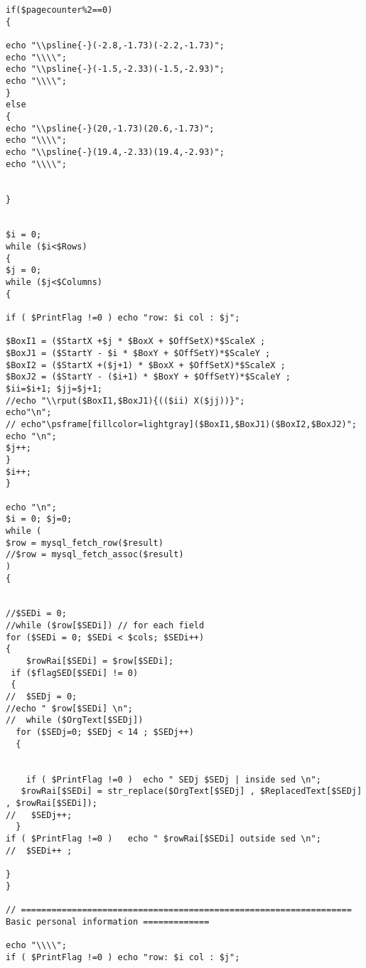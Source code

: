 \begin{verbatim}
if($pagecounter%2==0)
{

echo "\\psline{-}(-2.8,-1.73)(-2.2,-1.73)";
echo "\\\\";
echo "\\psline{-}(-1.5,-2.33)(-1.5,-2.93)";
echo "\\\\";
}
else
{
echo "\\psline{-}(20,-1.73)(20.6,-1.73)";
echo "\\\\";
echo "\\psline{-}(19.4,-2.33)(19.4,-2.93)";
echo "\\\\";


}


$i = 0;
while ($i<$Rows)
{
$j = 0;
while ($j<$Columns)
{

if ( $PrintFlag !=0 ) echo "row: $i col : $j";

$BoxI1 = ($StartX +$j * $BoxX + $OffSetX)*$ScaleX ;
$BoxJ1 = ($StartY - $i * $BoxY + $OffSetY)*$ScaleY ;
$BoxI2 = ($StartX +($j+1) * $BoxX + $OffSetX)*$ScaleX ;
$BoxJ2 = ($StartY - ($i+1) * $BoxY + $OffSetY)*$ScaleY ;
$ii=$i+1; $jj=$j+1; 
//echo "\\rput($BoxI1,$BoxJ1){(($ii) X($jj))}";
echo"\n";
// echo"\psframe[fillcolor=lightgray]($BoxI1,$BoxJ1)($BoxI2,$BoxJ2)"; echo "\n";
$j++;
}
$i++;
}

echo "\n";
$i = 0; $j=0;
while (
$row = mysql_fetch_row($result)
//$row = mysql_fetch_assoc($result)
)
{


//$SEDi = 0;
//while ($row[$SEDi]) // for each field
for ($SEDi = 0; $SEDi < $cols; $SEDi++)
{
    $rowRai[$SEDi] = $row[$SEDi];
 if ($flagSED[$SEDi] != 0)
 {
//  $SEDj = 0;
//echo " $row[$SEDi] \n";
//  while ($OrgText[$SEDj])
  for ($SEDj=0; $SEDj < 14 ; $SEDj++)
  { 


    if ( $PrintFlag !=0 )  echo " SEDj $SEDj | inside sed \n";
   $rowRai[$SEDi] = str_replace($OrgText[$SEDj] , $ReplacedText[$SEDj] , $rowRai[$SEDi]);
//   $SEDj++;
  }
if ( $PrintFlag !=0 )   echo " $rowRai[$SEDi] outside sed \n"; 
//  $SEDi++ ;

}
}
    
// ================================================================= Basic personal information =============

echo "\\\\";
if ( $PrintFlag !=0 ) echo "row: $i col : $j";
 

\end{verbatim}
